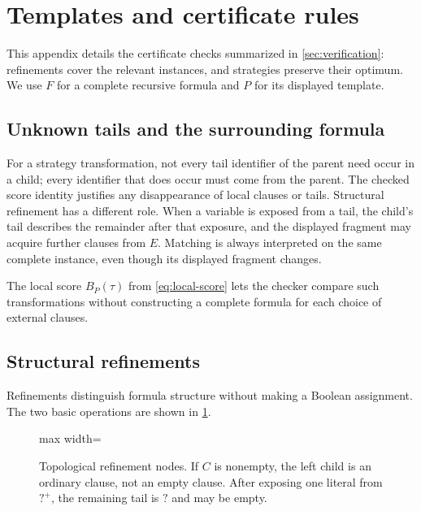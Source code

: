 \documentclass[10pt,twoside]{article}
\newcommand{\anytail}{\mathord{?}}
\newcommand{\plustail}{\mathord{?}^{+}}
\theoremstyle{definition}
\theoremstyle{remark}
\begin{document}
\appendix
\section{Templates and certificate rules}
\label{sec:certificate}

This appendix details the certificate checks summarized in
\cref{sec:verification}: refinements cover the relevant
instances, and strategies preserve their optimum. We use $F$ for a complete
recursive formula and $P$ for its displayed template.

\subsection{Unknown tails and the surrounding formula}

For a strategy transformation, not every tail identifier of the parent need
occur in a child; every identifier that does occur must come from the parent.
The checked score identity justifies any disappearance of local clauses or
tails. Structural refinement has a different role. When a variable is exposed
from a tail, the child's tail describes the remainder after that exposure, and
the displayed fragment may acquire further clauses from $E$. Matching is
always interpreted on the same complete instance, even though its displayed
fragment changes.

The local score $B_P(\tau)$ from \cref{eq:local-score} lets the checker compare
such transformations without constructing a complete formula for each choice
of external clauses.

\subsection{Structural refinements}
\label{sec:refinements}

Refinements distinguish formula structure without making a Boolean assignment.
The two basic operations are shown in \cref{fig:refinement}.

\begin{figure}[!htbp]
\centering
\begin{adjustbox}{max width=\linewidth}
\end{adjustbox}
\caption{Topological refinement nodes. If $C$ is nonempty, the left child is
an ordinary clause, not an empty clause. After exposing one literal from
$\plustail$, the remaining tail is $\anytail$ and may be empty.}
\label{fig:refinement}
\end{figure}
\end{document}
